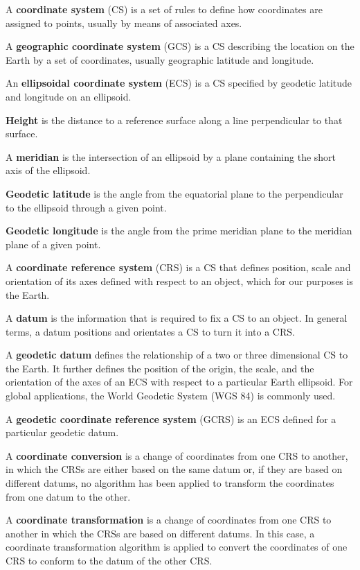 \documentclass[10pt,a4paper]{article}
\begin{document}
A \textbf{coordinate system} (CS) is a set of rules to define how coordinates are assigned to points, usually by means of associated axes. 

A \textbf{geographic coordinate system} (GCS) is a CS describing the location on the Earth by a set of coordinates, usually geographic latitude and longitude.

An \textbf{ellipsoidal coordinate system} (ECS) is a CS specified by geodetic latitude and longitude on an ellipsoid. 

\textbf{Height} is the distance to a reference surface along a line perpendicular to that surface.

A \textbf{meridian} is the intersection of an ellipsoid by a plane containing the short axis of the ellipsoid.

\textbf{Geodetic latitude} is the angle from the equatorial plane to the perpendicular to the ellipsoid through a given point. 

\textbf{Geodetic longitude} is the angle from the prime meridian plane to the meridian plane of a given point. 

A \textbf{coordinate reference system} (CRS) is a CS that defines position, scale and orientation of its axes defined with respect to an object, which for our purposes is the Earth. 

A \textbf{datum} is the information that is required to fix a CS to an object. In general terms, a datum positions and orientates a CS to turn it into a CRS.

A \textbf{geodetic datum} defines the relationship of a two or three dimensional CS to the Earth. It further defines the position of the origin, the scale, and the orientation of the axes of an ECS with respect to a particular Earth ellipsoid. For global applications, the World Geodetic System (WGS 84) is commonly used.

A \textbf{geodetic coordinate reference system} (GCRS) is an ECS defined for a particular geodetic datum. 

A \textbf{coordinate conversion} is a change of coordinates from one CRS to another, in which the CRSs are either based on the same datum or, if they are based on different datums, no algorithm has been applied to transform the coordinates from one datum to the other. 

A \textbf{coordinate transformation} is a change of coordinates from one CRS to another in which the CRSs are based on different datums. In this case, a coordinate transformation algorithm is applied to convert the coordinates of one CRS to conform to the datum of the other CRS. 
\end{document}
